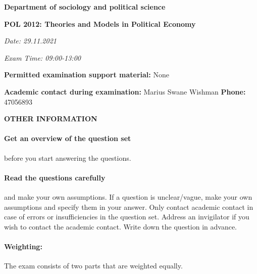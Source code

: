 \documentclass[a4paper,12pt,fleqn]{article}
\newcommand{\institution}{Department of sociology and political science}
\newcommand{\titlehd}{POL 2012: Theories and Models in Political Economy}
\newcommand{\examdate}{29.11.2021}
\newcommand{\examtime}{09:00-13:00}
\begin{document}

\begin{center}
\large\textbf{\institution}
\end{center}
\vspace{.5cm}

\begin{center}
\large\textbf{\titlehd}
\end{center}

\begin{center}
\textit{Date: \examdate}
\end{center}

\begin{center}
\textit{Exam Time: \examtime}
\end{center}

\vspace{.5cm}

\begin{center}
	\textbf{Permitted examination support material:} None
\end{center}

\begin{center}
	\textbf{Academic contact during examination:} Marius Swane Wishman
	\textbf{Phone:} 47056893
\end{center}

\vspace{.5cm}

\begin{center}
	\textbf{OTHER INFORMATION}
\end{center}

\paragraph{\textbf{Get an overview of the question set}} before you start
answering the questions.

\paragraph{\textbf{Read the questions carefully}} and make your own assumptions.
If a question is unclear/vague, make your own assumptions and specify them in
your answer. Only contact academic contact in case of errors or insufficiencies
in the question set. Address an invigilator if you wish to contact the academic
contact. Write down the question in advance.

\paragraph{\textbf{Weighting:}} The exam consists of two parts that are weighted
equally.
\end{document}
